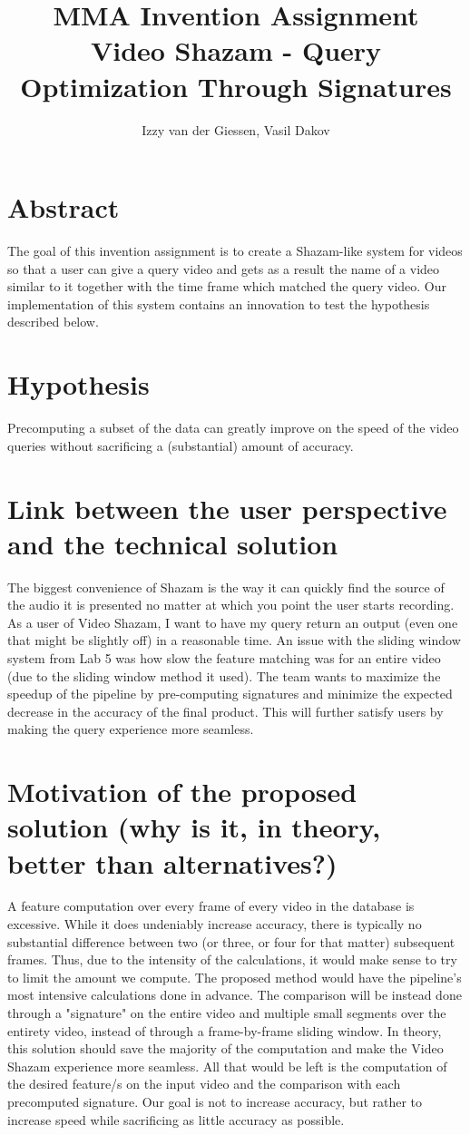 \documentclass{article}
\title{%
  MMA Invention Assignment \\
  \large Video Shazam - Query Optimization Through Signatures}
\author{Izzy van der Giessen, Vasil Dakov}
\date{}
\newcommand\tab[1][1cm]{\hspace*{#1}}
\begin{document}
\maketitle

\section*{Abstract}
\tab The goal of this invention assignment is to create a Shazam-like system for videos so that a user can give a query video and gets as a result the name of a video similar to it together with the time frame which matched the query video. Our implementation of this system contains an innovation to test the hypothesis described below.

\section*{Hypothesis}
\tab Precomputing a subset of the data can greatly improve on the speed of the video queries without sacrificing a (substantial) amount of accuracy.

\section*{Link between the user perspective and the technical solution}
\tab The biggest convenience of Shazam is the way it can quickly find the source of the audio it is presented no matter at which you point the user starts recording. As a user of Video Shazam, I want to have my query return an output (even one that might be slightly off) in a reasonable time. An issue with the sliding window system from Lab 5 was how slow the feature matching was for an entire video (due to the sliding window method it used). The team wants to maximize the speedup of the pipeline by pre-computing signatures and minimize the expected decrease in the accuracy of the final product. This will further satisfy users by making the query experience more seamless.

\section*{Motivation of the proposed solution (why is it, in theory, better than alternatives?)}
\tab A feature computation over every frame of every video in the database is excessive. While it does undeniably increase accuracy, there is typically no substantial difference between two (or three, or four for that matter) subsequent frames. Thus, due to the intensity of the calculations, it would make sense to try to limit the amount we compute. The proposed method would have the pipeline's most intensive calculations done in advance. The comparison will be instead done through a "signature" on the entire video and multiple small segments over the entirety video, instead of through a frame-by-frame sliding window. In theory, this solution should save the majority of the computation and make the Video Shazam experience more seamless. All that would be left is the computation of the desired feature/s on the input video and the comparison with each precomputed signature. Our goal is not to increase accuracy, but rather to increase speed while sacrificing as little accuracy as possible.
\end{document}
